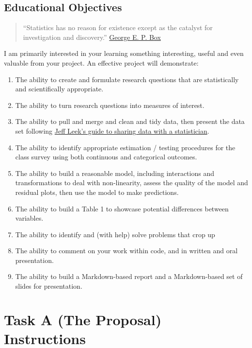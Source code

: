 \documentclass[]{book}
\providecommand{\tightlist}{%
  \setlength{\itemsep}{0pt}\setlength{\parskip}{0pt}}
\theoremstyle{definition}
\theoremstyle{definition}
\theoremstyle{definition}
\theoremstyle{remark}
\begin{document}
\hypertarget{educational-objectives}{%
\section{Educational Objectives}\label{educational-objectives}}

\begin{quote}
``Statistics has no reason for existence except as the catalyst for
investigation and discovery.''
\href{https://en.wikipedia.org/wiki/George_E._P._Box}{George E. P. Box}
\end{quote}

I am primarily interested in your learning something interesting, useful
and even valuable from your project. An effective project will
demonstrate:

\begin{enumerate}
\def\labelenumi{\arabic{enumi}.}
\tightlist
\item
  The ability to create and formulate research questions that are
  statistically and scientifically appropriate.
\item
  The ability to turn research questions into measures of interest.
\item
  The ability to pull and merge and clean and tidy data, then present
  the data set following
  \href{https://github.com/jtleek/datasharing}{Jeff Leek's guide to
  sharing data with a statistician}.
\item
  The ability to identify appropriate estimation / testing procedures
  for the class survey using both continuous and categorical outcomes.
\item
  The ability to build a reasonable model, including interactions and
  transformations to deal with non-linearity, assess the quality of the
  model and residual plots, then use the model to make predictions.
\item
  The ability to build a Table 1 to showcase potential differences
  between variables.
\item
  The ability to identify and (with help) solve problems that crop up
\item
  The ability to comment on your work within code, and in written and
  oral presentation.
\item
  The ability to build a Markdown-based report and a Markdown-based set
  of slides for presentation.
\end{enumerate}

\hypertarget{task-a-the-proposal-instructions}{%
\chapter{Task A (The Proposal)
Instructions}\label{task-a-the-proposal-instructions}}
\end{document}
